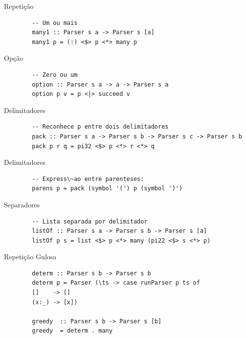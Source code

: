 \begin{frame}[fragile]{Repetição}

    \begin{lstlisting}
        -- Um ou mais
        many1 :: Parser s a -> Parser s [a]
        many1 p = (:) <$> p <*> many p
    \end{lstlisting}
\end{frame}

\begin{frame}[fragile]{Opção}

    \begin{lstlisting}
        -- Zero ou um
        option :: Parser s a -> a -> Parser s a
        option p v = p <|> succeed v
    \end{lstlisting}
\end{frame}

\begin{frame}[fragile]{Delimitadores}

    \begin{lstlisting}
        -- Reconhece p entre dois delimitadores
        pack :: Parser s a -> Parser s b -> Parser s c -> Parser s b
        pack p r q = pi32 <$> p <*> r <*> q
    \end{lstlisting}
\end{frame}

\begin{frame}[fragile]{Delimitadores}

    \begin{lstlisting}
        -- Express\~ao entre parenteses:
        parens p = pack (symbol '(') p (symbol ')')
    \end{lstlisting}
\end{frame}

\begin{frame}[fragile]{Separadores}

    \begin{lstlisting}
        -- Lista separada por delimitador
        listOf :: Parser s a -> Parser s b -> Parser s [a]
        listOf p s = list <$> p <*> many (pi22 <$> s <*> p)
    \end{lstlisting}
\end{frame}

\begin{frame}[fragile]{Repetição Gulosa}

    \begin{lstlisting}
        determ :: Parser s b -> Parser s b
        determ p = Parser (\ts -> case runParser p ts of
        []    -> []
        (x:_) -> [x])

        greedy  :: Parser s b -> Parser s [b]
        greedy  = determ . many
    \end{lstlisting}
\end{frame}

